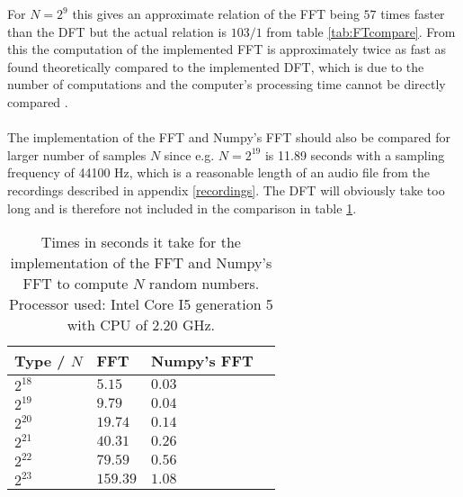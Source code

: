   
For $N=2^9$ this gives an approximate relation of the FFT being $57$ times faster than the DFT but the actual relation is $103/1$ from table \ref{tab:FTcompare}. From this the computation of the implemented FFT is approximately twice as fast as found theoretically compared to the implemented DFT, which is due to the number of computations and the computer's processing time cannot be directly compared . \\
\\
The implementation of the FFT and Numpy's FFT should also be compared for larger number of samples $N$ since e.g. $N = 2^{19}$ is 11.89 seconds with a sampling frequency of 44100 Hz, which is a reasonable length of an audio file from the recordings described in appendix \ref{recordings}. The DFT will obviously take too long and is therefore not included in the comparison in table \ref{tab:FT2compare}.

\begin{table}[H]
\centering
\begin{tabular}{|l|l|l|l|}
\hline
Type / $N$ & FFT	   & Numpy's FFT \\ \hline
$2^{18}$   & $5.15$    & $0.03$ \\ \hline
$2^{19}$   & $9.79$    & $0.04$ \\ \hline
$2^{20}$   & $19.74$   & $0.14$ \\ \hline
$2^{21}$   & $40.31$   & $0.26$ \\ \hline
$2^{22}$   & $79.59$   & $0.56$ \\ \hline
$2^{23}$   & $159.39$  & $1.08$ \\ \hline
\end{tabular}
\caption{Times in seconds it take for the implementation of the FFT and Numpy's FFT to compute $N$ random numbers. Processor used: Intel Core I5 generation 5 with CPU of 2.20 GHz.}
\label{tab:FT2compare}
\end{table}

